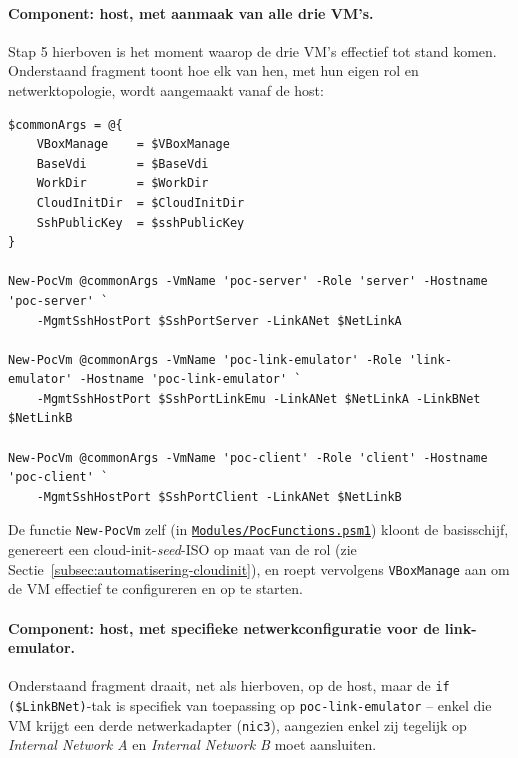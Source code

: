 \paragraph{Component: host, met aanmaak van alle drie VM's.} Stap 5 hierboven is het
moment waarop de drie VM's effectief tot stand komen. Onderstaand fragment toont hoe elk
van hen, met hun eigen rol en netwerktopologie, wordt aangemaakt vanaf de host:

\begin{listing}[h]
\begin{lstlisting}[style=powershellstyle]
$commonArgs = @{
    VBoxManage    = $VBoxManage
    BaseVdi       = $BaseVdi
    WorkDir       = $WorkDir
    CloudInitDir  = $CloudInitDir
    SshPublicKey  = $sshPublicKey
}

New-PocVm @commonArgs -VmName 'poc-server' -Role 'server' -Hostname 'poc-server' `
    -MgmtSshHostPort $SshPortServer -LinkANet $NetLinkA

New-PocVm @commonArgs -VmName 'poc-link-emulator' -Role 'link-emulator' -Hostname 'poc-link-emulator' `
    -MgmtSshHostPort $SshPortLinkEmu -LinkANet $NetLinkA -LinkBNet $NetLinkB

New-PocVm @commonArgs -VmName 'poc-client' -Role 'client' -Hostname 'poc-client' `
    -MgmtSshHostPort $SshPortClient -LinkANet $NetLinkB
\end{lstlisting}
\caption[Aanmaak van de drie PoC-VM's]{Fragment uit \texttt{Build-PoC.ps1}: aanroep van
de \texttt{New-PocVm}-functie voor elk van de drie rollen. Enkel de link-emulator krijgt
een \texttt{LinkBNet}, aangezien alleen zij op beide segmenten tegelijk moet aansluiten.
Uitgevoerd op: de host, ter aanmaak van \texttt{poc-server}, \texttt{poc-link-emulator}
en \texttt{poc-client}.}
\label{lst:create-vm-calls}
\end{listing}

De functie \texttt{New-PocVm} zelf (in
\href{code/scripts/Modules/PocFunctions.psm1}{\texttt{Modules/PocFunctions.psm1}}) kloont
de basisschijf, genereert een cloud-init-\textit{seed}-ISO op maat van de rol (zie
Sectie~\ref{subsec:automatisering-cloudinit}), en roept vervolgens \texttt{VBoxManage}
aan om de VM effectief te configureren en op te starten.

\paragraph{Component: host, met specifieke netwerkconfiguratie voor de link-emulator.}
Onderstaand fragment draait, net als hierboven, op de host, maar de \texttt{if
(\$LinkBNet)}-tak is specifiek van toepassing op \texttt{poc-link-emulator} -- enkel die
VM krijgt een derde netwerkadapter (\texttt{nic3}), aangezien enkel zij tegelijk op
\textit{Internal Network A} en \textit{Internal Network B} moet aansluiten.

